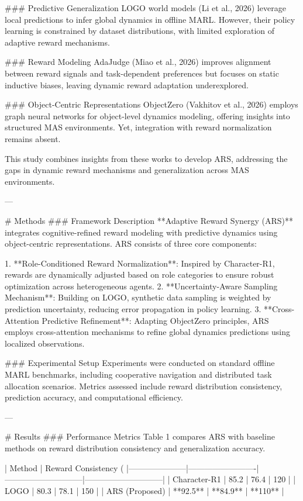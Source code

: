 ### Predictive Generalization  
LOGO world models (Li et al., 2026) leverage local predictions to infer global dynamics in offline MARL. However, their policy learning is constrained by dataset distributions, with limited exploration of adaptive reward mechanisms.

### Reward Modeling  
AdaJudge (Miao et al., 2026) improves alignment between reward signals and task-dependent preferences but focuses on static inductive biases, leaving dynamic reward adaptation underexplored.

### Object-Centric Representations  
ObjectZero (Vakhitov et al., 2026) employs graph neural networks for object-level dynamics modeling, offering insights into structured MAS environments. Yet, integration with reward normalization remains absent.

This study combines insights from these works to develop ARS, addressing the gaps in dynamic reward mechanisms and generalization across MAS environments.

---

# Methods  
### Framework Description  
**Adaptive Reward Synergy (ARS)** integrates cognitive-refined reward modeling with predictive dynamics using object-centric representations. ARS consists of three core components:

1. **Role-Conditioned Reward Normalization**: Inspired by Character-R1, rewards are dynamically adjusted based on role categories to ensure robust optimization across heterogeneous agents.
2. **Uncertainty-Aware Sampling Mechanism**: Building on LOGO, synthetic data sampling is weighted by prediction uncertainty, reducing error propagation in policy learning.
3. **Cross-Attention Predictive Refinement**: Adapting ObjectZero principles, ARS employs cross-attention mechanisms to refine global dynamics predictions using localized observations.

### Experimental Setup  
Experiments were conducted on standard offline MARL benchmarks, including cooperative navigation and distributed task allocation scenarios. Metrics assessed include reward distribution consistency, prediction accuracy, and computational efficiency.

---

# Results  
### Performance Metrics  
Table 1 compares ARS with baseline methods on reward distribution consistency and generalization accuracy.

| Method              | Reward Consistency (%
|---------------------|-------------------------|-----------------------------|-----------------------------|
| Character-R1        | 85.2                   | 76.4                        | 120                         |
| LOGO                | 80.3                   | 78.1                        | 150                         |
| ARS (Proposed)      | **92.5**               | **84.9**                    | **110**                     |


